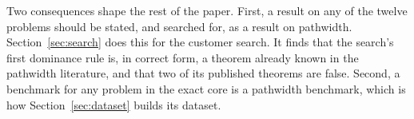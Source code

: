 Two consequences shape the rest of the paper. First, a result on any of the
twelve problems should be stated, and searched for, as a result on pathwidth.
Section~\ref{sec:search} does this for the customer search. It finds that the
search's first dominance rule is, in correct form, a theorem already known in
the pathwidth literature, and that two of its published theorems are false.
Second, a benchmark for any problem in the exact core is a pathwidth benchmark,
which is how Section~\ref{sec:dataset} builds its dataset.
